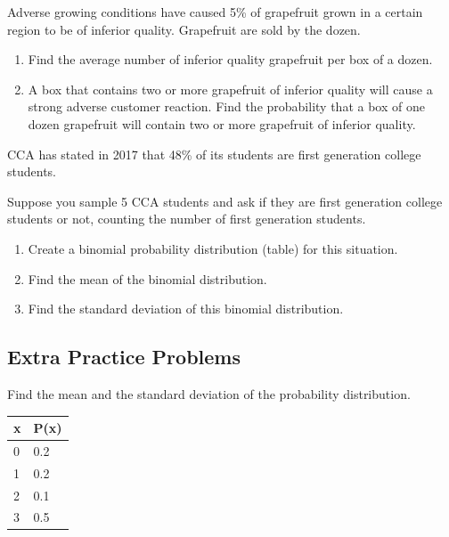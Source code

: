 \begin{exercise}

Adverse growing conditions have caused 5\% of grapefruit grown in a
certain region to be of inferior quality. Grapefruit are sold by the
dozen.

\begin{enumerate}
\item
  Find the average number of inferior quality grapefruit per box of a
  dozen.
\item
  A box that contains two or more grapefruit of inferior quality will
  cause a strong adverse customer reaction. Find the probability that a
  box of one dozen grapefruit will contain two or more grapefruit of
  inferior quality.
\end{enumerate}

\end{exercise}

\begin{exercise}

CCA has stated in 2017 that 48\% of its students are first generation
college students.

Suppose you sample 5 CCA students and ask if they are first generation
college students or not, counting the number of first generation
students.

\begin{enumerate}
\item
  Create a binomial probability distribution (table) for this situation.
\item
  Find the mean of the binomial distribution.
\item
  Find the standard deviation of this binomial distribution.
\end{enumerate}

\end{exercise}

\hypertarget{extra-practice-problems}{%
\subsection{Extra Practice Problems}\label{extra-practice-problems}}

\begin{exercise}

Find the mean and the standard deviation of the probability
distribution.

\begin{tabular}{ll}
\toprule
x & P(x) \\
\midrule
0 & 0.2 \\
1 & 0.2 \\
2 & 0.1 \\
3 & 0.5 \\
\bottomrule
\end{tabular}

\end{exercise}

